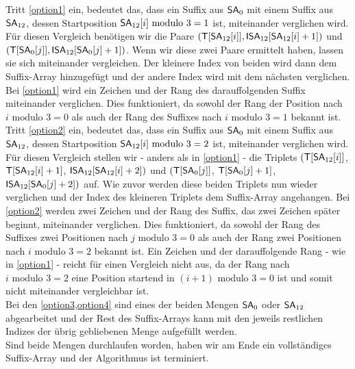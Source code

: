 Tritt \cref{option1} ein, bedeutet das, dass ein Suffix aus $\sa_{0}$ mit einem Suffix aus $\sa_{12}$, dessen Startposition $\sa_{12}[i] \text{ modulo } 3 = 1$ ist, miteinander verglichen wird. Für diesen Vergleich benötigen wir die Paare $(\inputtext[\sa_{12}[i]], \isa_{12}[\sa_{12}[i]+1])$ und $(\inputtext[\sa_{0}[j]], \isa_{12}[\sa_{0}[j]+1])$. Wenn wir diese zwei Paare ermittelt haben, lassen sie sich miteinander vergleichen. Der kleinere Index von beiden wird dann dem Suffix-Array \sa hinzugefügt und der andere Index wird mit dem nächsten verglichen. Bei \cref{option1} wird ein Zeichen und der Rang des darauffolgenden Suffix miteinander verglichen. Dies funktioniert, da sowohl der Rang der Position nach $i \text{ modulo } 3 = 0$ als auch der Rang des Suffixes nach $i \text{ modulo } 3 = 1$ bekannt ist. \\
Tritt \cref{option2} ein, bedeutet das, dass ein Suffix aus $\sa_{0}$ mit einem Suffix aus $\sa_{12}$, dessen Startposition $\sa_{12}[i] \text{ modulo } 3 = 2$ ist, miteinander verglichen wird. Für diesen Vergleich stellen wir - anders als in \cref{option1} - die Triplets $(\inputtext[\sa_{12}[i]]$, $\inputtext[\sa_{12}[i]+1]$, $\isa_{12}[\sa_{12}[i]+2])$ und $(\inputtext[\sa_{0}[j]]$, $\inputtext[\sa_{0}[j]+1]$, $\isa_{12}[\sa_{0}[j]+2])$ auf. Wie zuvor werden diese beiden Triplets nun wieder verglichen und der Index des kleineren Triplets dem Suffix-Array angehangen. Bei \cref{option2} werden zwei Zeichen und der Rang des Suffix, das zwei Zeichen später beginnt, miteinander verglichen. Dies funktioniert, da sowohl der Rang des Suffixes zwei Positionen nach $j \text{ modulo } 3 = 0$ als auch der Rang zwei Positionen nach $i \text{ modulo } 3 = 2$ bekannt ist. Ein Zeichen und der darauffolgende Rang - wie in \cref{option1} - reicht für einen Vergleich nicht aus, da der Rang nach $i \text{ modulo } 3 = 2$ eine Position startend in $(i+1) \text{ modulo } 3 = 0$ ist und somit nicht miteinander vergleichbar ist.\\
Bei den \cref{option3,option4} sind eines der beiden Mengen $\sa_{0}$ oder $\sa_{12}$ abgearbeitet und der Rest des Suffix-Arrays kann mit den jeweils restlichen Indizes der übrig gebliebenen Menge aufgefüllt werden.\\
Sind beide Mengen durchlaufen worden, haben wir am Ende ein vollständiges Suffix-Array und der Algorithmus ist terminiert.

